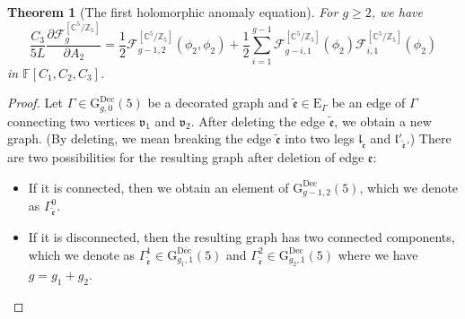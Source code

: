 \documentclass[12pt]{amsart}
\newtheorem{thm}[prop]{Theorem}
\numberwithin{equation}{section}
\begin{document}
\begin{thm}[The first holomorphic anomaly equation]\label{thm:HAE_wrt_A2_partial}
For $g\geq{2}$, we have
\begin{equation*}
\frac{C_{3}}{5L}\frac{\partial\mathcal{F}_{g}^{\left[\mathbb{C}^{5} / \mathbb{Z}_{5}\right]}}{\partial A_2}
=\frac{1}{2}\mathcal{F}_{g-1,2}^{\left[\mathbb{C}^5 / \mathbb{Z}_5\right]}\left(\phi_2,\phi_2\right)+\frac{1}{2}\sum_{i=1}^{g-1}\mathcal{F}_{g-i,1}^{\left[\mathbb{C}^5 / \mathbb{Z}_5\right]}\left(\phi_2\right)\mathcal{F}_{i,1}^{\left[\mathbb{C}^5 / \mathbb{Z}_5\right]}\left(\phi_2\right)
\end{equation*}
in $\mathbb{F}[C_1,C_2,C_3]$.
\end{thm}
\begin{proof}
Let $\Gamma\in\mathrm{G}_{g,0}^{\text{Dec}}(5)$ be a decorated graph and $\tilde{\mathfrak{e}}\in\mathrm{E}_{\Gamma}$ be an edge of $\Gamma$ connecting two vertices $\mathfrak{v}_1$ and $\mathfrak{v}_2$. After deleting the edge $\tilde{\mathfrak{e}}$, we obtain a new graph. (By deleting, we mean breaking the edge $\tilde{\mathfrak{e}}$ into two legs $\mathfrak{l}_{\tilde{\mathfrak{e}}}$ and $\mathfrak{l}'_{\tilde{\mathfrak{e}}}$.) There are two possibilities for the resulting graph after deletion of edge $\mathfrak{e}$:
\begin{itemize}
    \item[(i)] If it is connected, then we obtain an element of $\mathrm{G}_{g-1,2}^{\text{Dec}}(5)$, which we denote as $\Gamma_{\tilde{\mathfrak{e}}}^0$.
    
    \item[(ii)] If it is disconnected, then the resulting graph has two connected components, which we  denote as $\Gamma_{\tilde{\mathfrak{e}}}^1\in\mathrm{G}_{g_1,1}^{\text{Dec}}(5)$ and $\Gamma_{\tilde{\mathfrak{e}}}^2\in\mathrm{G}_{g_2,1}^{\text{Dec}}(5)$ where we have $g=g_1+g_2$.
\end{itemize}


\end{proof}
\end{document}
